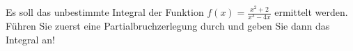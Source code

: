 \item Es soll das unbestimmte Integral der Funktion $f(x) = \frac{x^2+2}{x^3-4x}$ ermittelt werden. Führen Sie zuerst eine Partialbruchzerlegung durch und geben Sie dann das Integral an!
